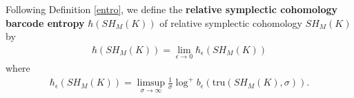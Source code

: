 \documentclass[12pt]{amsart}
\theoremstyle{definition}
\newcommand{\ZZ}{{\mathbb Z}}
\begin{document}
\vspace{0.2 cm}

Following Definition \ref{entro}, we define the \textbf{relative symplectic cohomology barcode entropy} $\hbar(SH_M(K))$ of relative symplectic cohomology $SH_M(K)$ by
\begin{align*}
    \hbar(SH_M(K)) = \lim_{\epsilon \to 0} \hbar_{\epsilon} (SH_M(K))
\end{align*}
where
\begin{align*}
    \hbar_{\epsilon} (SH_M(K)) = \limsup_{\sigma \to \infty} \frac{1}{\sigma}\log^+b_{\epsilon}(\textrm{tru}(SH_M(K), \sigma)).
\end{align*}
\vspace{0.2cm}
\end{document}
